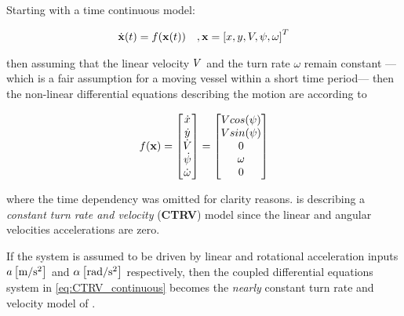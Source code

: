 Starting with a time continuous model:

\begin{equation}
\begin{aligned}\dot{\mathbf{x}}(t) = f(\mathbf{x}(t)) &&,\mathbf{x} = \left[x,y,{V}, {\psi},\omega\right]^{T}  \end{aligned}
\end{equation}


then assuming that the linear velocity ${V}$ and the turn rate $\omega$ remain constant  --- which is a fair assumption for a moving vessel within a short time period--- then the non-linear differential equations describing the motion are according to \cite{Schubert2008}

\begin{equation}\label{eq:CTRV_continuous}
f(\mathbf{x}) =\begin{bmatrix}\dot{x} \\ \dot{y} \\ \dot{{V}} \\ \dot{{\psi}} \\ \dot{\omega}  \end{bmatrix}=  \begin{bmatrix}{V} cos({\psi}) \\ {V} sin({\psi}) \\ 0 \\ \omega \\ 0  \end{bmatrix}
\end{equation}

where the time dependency was omitted for clarity reasons.  is describing a \emph{constant turn rate and velocity} (\textbf{CTRV}) model since the linear and angular velocities accelerations are zero.

If the system is assumed to be driven by linear and rotational acceleration inputs $a \left[\si{\meter\per\second^2}\right]$ and $\alpha \left[\si{\radian\per\second^2}\right]$ respectively, then the coupled differential equations system in \eqref{eq:CTRV_continuous} becomes the \emph{nearly} constant turn rate and velocity model of .

